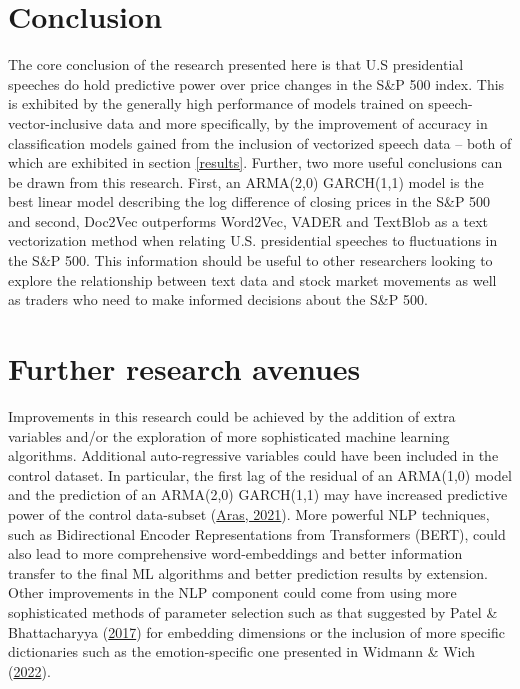 \documentclass[11pt,preprint, authoryear]{elsarticle}
\numberwithin{equation}{section}
\numberwithin{figure}{section}
\numberwithin{table}{section}
\begin{document}
\hypertarget{conclusion}{%
\section{Conclusion}\label{conclusion}}

The core conclusion of the research presented here is that U.S
presidential speeches do hold predictive power over price changes in the
S\&P 500 index. This is exhibited by the generally high performance of
models trained on speech-vector-inclusive data and more specifically, by
the improvement of accuracy in classification models gained from the
inclusion of vectorized speech data -- both of which are exhibited in
section \ref{results}. Further, two more useful conclusions can be drawn
from this research. First, an ARMA(2,0) GARCH(1,1) model is the best
linear model describing the log difference of closing prices in the S\&P
500 and second, Doc2Vec outperforms Word2Vec, VADER and TextBlob as a
text vectorization method when relating U.S. presidential speeches to
fluctuations in the S\&P 500. This information should be useful to other
researchers looking to explore the relationship between text data and
stock market movements as well as traders who need to make informed
decisions about the S\&P 500.

\hypertarget{further-research-avenues}{%
\section{Further research avenues}\label{further-research-avenues}}

Improvements in this research could be achieved by the addition of extra
variables and/or the exploration of more sophisticated machine learning
algorithms. Additional auto-regressive variables could have been
included in the control dataset. In particular, the first lag of the
residual of an ARMA(1,0) model and the prediction of an ARMA(2,0)
GARCH(1,1) may have increased predictive power of the control
data-subset (\protect\hyperlink{ref-aras2021stacking}{Aras, 2021}). More
powerful NLP techniques, such as Bidirectional Encoder Representations
from Transformers (BERT), could also lead to more comprehensive
word-embeddings and better information transfer to the final ML
algorithms and better prediction results by extension. Other
improvements in the NLP component could come from using more
sophisticated methods of parameter selection such as that suggested by
Patel \& Bhattacharyya
(\protect\hyperlink{ref-patel-bhattacharyya-2017-towards}{2017}) for
embedding dimensions or the inclusion of more specific dictionaries such
as the emotion-specific one presented in Widmann \& Wich
(\protect\hyperlink{ref-widmann_wich_2022}{2022}).
\end{document}
